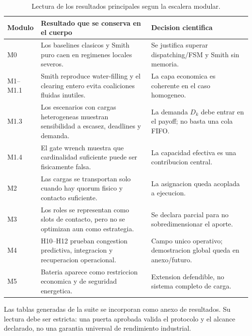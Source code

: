 \begin{table}[H]
\centering
\footnotesize
\begin{tabularx}{\textwidth}{@{}p{}p{}Y@{}}
\toprule
Modulo & Resultado que se conserva en el cuerpo & Decision cientifica \\
\midrule
M0 & Los baselines clasicos y Smith puro caen en regimenes locales severos. & Se justifica superar dispatching/FSM y Smith sin memoria. \\
M1--M1.1 & Smith reproduce water-filling y el clearing entero evita coaliciones fluidas inutiles. & La capa economica es coherente en el caso homogeneo. \\
M1.3 & Los escenarios con cargas heterogeneas muestran sensibilidad a escasez, deadlines y demanda. & La demanda $D_k$ debe entrar en el payoff; no basta una cola FIFO. \\
M1.4 & El gate wrench muestra que cardinalidad suficiente puede ser fisicamente falsa. & La capacidad efectiva es una contribucion central. \\
M2 & Las cargas se transportan solo cuando hay quorum fisico y contacto suficiente. & La asignacion queda acoplada a ejecucion. \\
M3 & Los roles se representan como slots de contacto, pero no se optimizan aun como estrategia. & Se declara parcial para no sobredimensionar el aporte. \\
M4 & H10--H12 prueban congestion predictiva, integracion y recuperacion operacional. & Campo unico operativo; demostracion global queda en anexo/futuro. \\
M5 & Bateria aparece como restriccion economica y de seguridad energetica. & Extension defendible, no sistema completo de carga. \\
\bottomrule
\end{tabularx}
\caption{Lectura de los resultados principales segun la escalera modular.}
\label{tab:resultados-por-modulo}
\end{table}

Las tablas generadas de la suite se incorporan como anexo de resultados. Su lectura debe
ser estricta: una puerta aprobada valida el protocolo y el alcance declarado, no una
garantia universal de rendimiento industrial.

